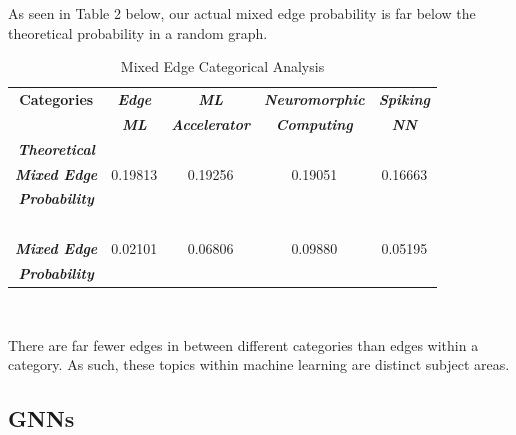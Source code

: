 \documentclass[conference]{IEEEtran}
\begin{document}
As seen in Table 2 below, our actual mixed edge probability is far 
below the theoretical probability in a random graph. \par

\begin{table}[htbp]
    \caption{Mixed Edge Categorical Analysis}
    \begin{center}
        \begin{tabular}{|c|cccc|}
        \hline
        \textbf{Categories} & \textbf{\textit{Edge}} & \textbf{\textit{ML}} & 
        \textbf{\textit{Neuromorphic}} & \textbf{\textit{Spiking}} \\
        \textbf{} & \textbf{\textit{ML}} & \textbf{\textit{Accelerator}} & 
        \textbf{\textit{Computing}} & \textbf{\textit{NN}} \\
        \hline
        \textbf{\textit{Theoretical}} &\ &\ &\ &\ \\
        \textbf{\textit{Mixed Edge}} &
        0.19813& 0.19256& 0.19051& 0.16663 \\
        \textbf{\textit{Probability}} & \ &\ &\ &\ \\
        \ & \ &\ &\ &\ \\
        \textbf{\textit{Mixed Edge}} & 
        0.02101& 0.06806& 0.09880& 0.05195 \\
        \textbf{\textit{Probability}} & \ &\ &\ &\ \\
        \hline
        \end{tabular}
        \label{tab2}
    \end{center}
\end{table}

\ \newline
\ \newline

There are far fewer edges in between different categories than edges within a category. 
As such, these topics within machine learning are distinct subject areas. \par

\subsection{GNNs}
\end{document}
